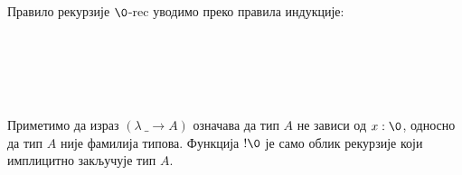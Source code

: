Правило рекурзије $\0$-rec уводимо преко правила индукције:
\begin{code}%
\>[0]\AgdaSpace{}%
\AgdaSymbol{:}\AgdaSpace{}%
\AgdaSymbol{(}\AgdaSpace{}%
\AgdaSymbol{:}\AgdaSpace{}%
\AgdaSpace{}%
\AgdaSpace{}%
\AgdaSymbol{)}\AgdaSpace{}%
\AgdaSpace{}%
\AgdaSpace{}%
\AgdaSpace{}%
\<%
\\
\>[0]\AgdaSpace{}%
\AgdaSpace{}%
\AgdaSpace{}%
\AgdaSymbol{=}\AgdaSpace{}%
\AgdaSpace{}%
\AgdaSpace{}%
\AgdaBound{\AgdaUnderscore{}}\AgdaSpace{}%
\AgdaSpace{}%
\AgdaSymbol{)}\AgdaSpace{}%
\<%
\\
%
\\[\AgdaEmptyExtraSkip]%
\>[0]\AgdaSpace{}%
\AgdaSymbol{:}\AgdaSpace{}%
\AgdaSymbol{\{}\AgdaSpace{}%
\AgdaSymbol{:}\AgdaSpace{}%
\AgdaSpace{}%
\AgdaSpace{}%
\AgdaSymbol{\}}\AgdaSpace{}%
\AgdaSpace{}%
\AgdaSpace{}%
\AgdaSpace{}%
\<%
\\
\>[0]\AgdaSpace{}%
\AgdaSymbol{\{}\AgdaSymbol{\}}\AgdaSpace{}%
\AgdaSymbol{\{}\AgdaSymbol{\}}\AgdaSpace{}%
\AgdaSymbol{=}\AgdaSpace{}%
\AgdaSpace{}%
\<%
\end{code}
Приметимо да израз $(λ~\_ \to A)$ означава да тип $A$ не зависи од $x : \0$, односно да тип $A$ није фамилија типова. Функција $!\0$ је само облик рекурзије који имплицитно закључује тип $A$.

